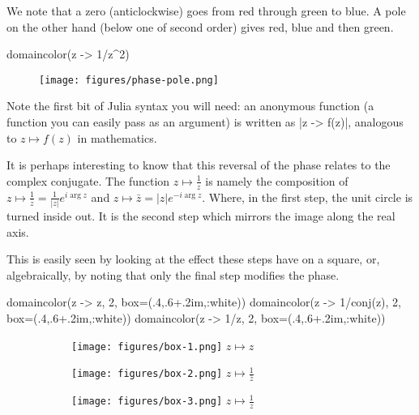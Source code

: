 \documentclass[a4paper]{article}
\begin{document}
We note that a zero (anticlockwise) goes from red through green to blue. A pole
on the other hand (below one of second order) gives red, blue and then green.

\begin{juliaverbatim}
	domaincolor(z -> 1/z^2)
\end{juliaverbatim}
\begin{figure}[H]
	\centering
	\texttt{[image: figures/phase-pole.png]}
\end{figure}

Note the first bit of Julia syntax you will need: an anonymous function (a
function you can easily pass as an argument) is written as \jlv|z -> f(z)|,
analogous to $z \mapsto f(z)$ in mathematics.

It is perhaps interesting to know that this reversal of the phase relates to the
complex conjugate. The function $z \mapsto \frac{1}{z}$ is namely the
composition of $z \mapsto \frac{1}{\bar{z}} = \frac{1}{|z|} e^{i\arg z}$ and
$z \mapsto \bar{z} = |z| e^{-i\arg z}$. Where, in the first step, the unit
circle is turned inside out. It is the second step which mirrors the image along
the real axis.

This is easily seen by looking at the effect these steps have on a square, or,
algebraically, by noting that only the final step modifies the phase.

\begin{juliaverbatim}
	domaincolor(z -> z, 2, box=(.4,.6+.2im,:white))
	domaincolor(z -> 1/conj(z), 2, box=(.4,.6+.2im,:white))
	domaincolor(z -> 1/z, 2, box=(.4,.6+.2im,:white))
\end{juliaverbatim}
\begin{figure}[H]
	\centering
	\begin{subfigure}{.3\textwidth}
		\centering
		\texttt{[image: figures/box-1.png]}
		$z \mapsto z$
	\end{subfigure}
	\hspace{1ex}
	\begin{subfigure}{.3\textwidth}
		\centering
		\texttt{[image: figures/box-2.png]}
		$z \mapsto \frac{1}{\bar{z}}$
	\end{subfigure}
	\hspace{1ex}
	\begin{subfigure}{.3\textwidth}
		\centering
		\texttt{[image: figures/box-3.png]}
		$z \mapsto \frac{1}{z}$
	\end{subfigure}
\end{figure}
\end{document}
